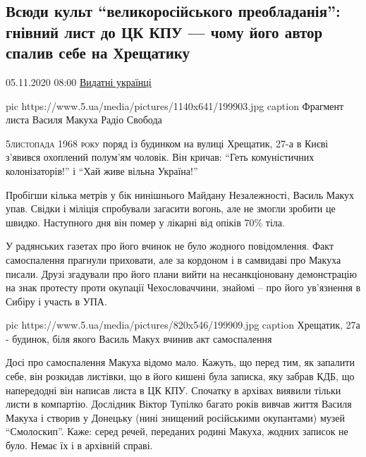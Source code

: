  
 
 

\subsection{Всюди культ \enquote{великоросійського преобладанія}: гнівний лист до ЦК КПУ --- чому його автор спалив себе на Хрещатику}
\label{sec:05_11_2020.news.ua.5ua.1.vasyl_makuh_kiev_1968_samospalennja}

05.11.2020 08:00 \href{https://www.5.ua/spetstemy/154/}{Видатні українці}


\ifcmt
pic https://www.5.ua/media/pictures/1140x641/199903.jpg
caption Фрагмент листа Василя Макуха Радіо Свобода
\fi

\lettrine[lines=3]{5}{листопада 1968 року} поряд із будинком на вулиці Хрещатик, 27-а в Києві
з'явився охоплений полум'ям чоловік. Він кричав: \enquote{Геть комуністичних
колонізаторів!} і \enquote{Хай живе вільна Україна!}

Пробігши кілька метрів у бік нинішнього Майдану Незалежності, Василь Макух
упав. Свідки і міліція спробували загасити вогонь, але не змогли зробити це
швидко. Наступного дня він помер у лікарні від опіків 70\% тіла.

У радянських газетах про його вчинок не було жодного повідомлення. Факт
самоспалення прагнули приховати, але за кордоном і в самвидаві про
Макуха писали. Друзі згадували про його плани вийти на несанкціоновану
демонстрацію на знак протесту проти окупації Чехословаччини, знайомі –
про його ув'язнення в Сибіру і участь в УПА.

\ifcmt
pic https://www.5.ua/media/pictures/820x546/199909.jpg
caption Хрещатик, 27а - будинок, біля якого Василь Макух вчинив акт самоспалення 
\fi

Досі про самоспалення Макуха відомо мало. Кажуть, що перед тим, як запалити
себе, він розкидав листівки, що в його кишені була записка, яку забрав КДБ, що
напередодні він написав листа в ЦК КПУ. Спочатку в архівах виявили тільки листи
в компартію. Дослідник Віктор Тупілко багато років вивчав життя Василя Макуха і
створив у Донецьку (нині знищений російськими окупантами) музей \enquote{Смолоскип}.
Каже: серед речей, переданих родині Макуха, жодних записок не було. Немає їх і
в архівній справі.

